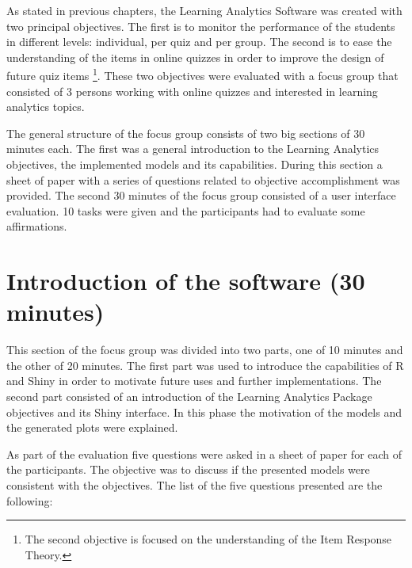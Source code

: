 

As stated in previous chapters, the Learning Analytics Software was created with two principal objectives. The first is to monitor the performance of the students in different levels: individual, per quiz and per group. The second is to ease the understanding of the items in online quizzes in order to improve the design of future quiz items \footnote{The second objective is focused on the understanding of the Item Response Theory.}. These two objectives were evaluated with a focus group that consisted of 3 persons working with online quizzes and interested in learning analytics topics. 

The general structure of the focus group consists of two big sections of 30 minutes each. The first was a general introduction to the Learning Analytics objectives, the implemented models and its capabilities. During this section a sheet of paper with a series of questions related to objective accomplishment was provided. The second 30 minutes of the focus group consisted of a user interface evaluation. 10 tasks were given and the participants had to evaluate some affirmations.

\section{Introduction of the software (30 minutes)}

This section of the focus group was divided into two parts, one of 10 minutes and the other of 20 minutes. The first part was used to introduce the capabilities of R and Shiny in order to motivate future uses and further implementations. The second part consisted of an introduction of the Learning Analytics Package objectives and its Shiny interface. In this phase the motivation of the models and the generated plots were explained.

As part of the evaluation five questions were asked in a sheet of paper for each of the participants. The objective was to discuss if the presented models were consistent with the objectives. The list of the five questions presented are the following:
  
